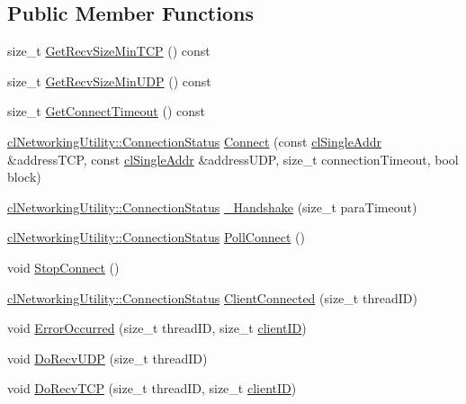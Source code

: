 \subsection*{Public Member Functions}
\begin{DoxyCompactItemize}
\item 
size\_\-t \hyperlink{classcl_client_state_a114e8dfb1061a13b207b8e54e4ee4830}{GetRecvSizeMinTCP} () const 
\item 
size\_\-t \hyperlink{classcl_client_state_ae68242becb3d84695b2f7112633a1ecc}{GetRecvSizeMinUDP} () const 
\item 
size\_\-t \hyperlink{classcl_client_state_af5273cc686055cb060b4ff2c2e3cc237}{GetConnectTimeout} () const 
\item 
\hyperlink{classcl_networking_utility_a15dd34683154e07d5843f8f5432fec6d}{clNetworkingUtility::ConnectionStatus} \hyperlink{classcl_client_state_a080073cb5cd9bc23f9ba54f1ed757e41}{Connect} (const \hyperlink{classcl_single_addr}{clSingleAddr} \&addressTCP, const \hyperlink{classcl_single_addr}{clSingleAddr} \&addressUDP, size\_\-t connectionTimeout, bool block)
\item 
\hyperlink{classcl_networking_utility_a15dd34683154e07d5843f8f5432fec6d}{clNetworkingUtility::ConnectionStatus} \hyperlink{classcl_client_state_a492c1690020513b638c0237ef493d5b3}{\_\-Handshake} (size\_\-t paraTimeout)
\item 
\hyperlink{classcl_networking_utility_a15dd34683154e07d5843f8f5432fec6d}{clNetworkingUtility::ConnectionStatus} \hyperlink{classcl_client_state_a82686bcb0526d9499a12346a1c58d73f}{PollConnect} ()
\item 
void \hyperlink{classcl_client_state_abf445888bd4e92122504654e7c74b5fb}{StopConnect} ()
\item 
\hyperlink{classcl_networking_utility_a15dd34683154e07d5843f8f5432fec6d}{clNetworkingUtility::ConnectionStatus} \hyperlink{classcl_client_state_aa77a903cb79356329a96d3b3cd5e5f79}{ClientConnected} (size\_\-t threadID)
\item 
void \hyperlink{classcl_client_state_af30b846a7bed7581322a639758f386f6}{ErrorOccurred} (size\_\-t threadID, size\_\-t \hyperlink{classcl_client_state_a4153db8a239f862cbd61bf8e75e25794}{clientID})
\item 
void \hyperlink{classcl_client_state_a0896fc48ea83b9d2c9db5c4fbb520cd0}{DoRecvUDP} (size\_\-t threadID)
\item 
void \hyperlink{classcl_client_state_a00fdb8cf2f551822cff470830e29fcdd}{DoRecvTCP} (size\_\-t threadID, size\_\-t \hyperlink{classcl_client_state_a4153db8a239f862cbd61bf8e75e25794}{clientID})

\end{DoxyCompactItemize}
